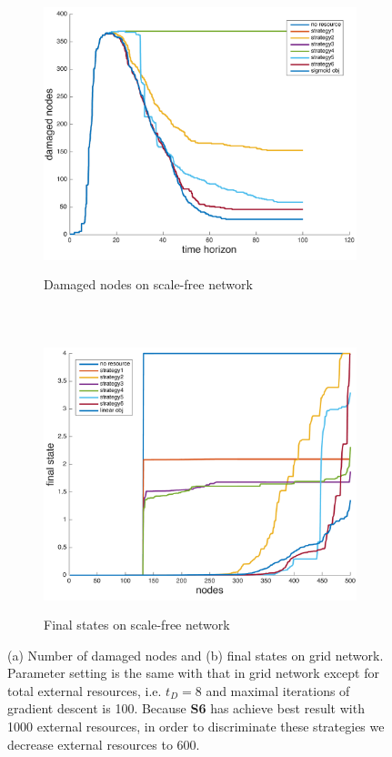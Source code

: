 \begin{figure}	
	\centering
	\begin{subfigure}[t]{0.8\textwidth}
		\centering
		\includegraphics[height=80mm]{../figs/no_linear_approximation/SF_damaged_small.pdf}
		\caption{Damaged nodes on scale-free network}
	\end{subfigure}
	~
	\begin{subfigure}[t]{0.8\textwidth}
		\centering
		\includegraphics[height=80mm]{../figs/no_linear_approximation/SF_finalState_small.pdf}
		\caption{Final states on scale-free network}
	\end{subfigure}
	\caption{(a) Number of damaged nodes and (b) final states on grid network. Parameter setting is the same with that in grid network except for total external resources, i.e. $t_D=8$ and maximal iterations of gradient descent is 100. Because \textbf{S6} has achieve best result with 1000 external resources, in order to discriminate these strategies we decrease external resources to 600.}
	\label{fig:opt_on_sf}
\end{figure}





